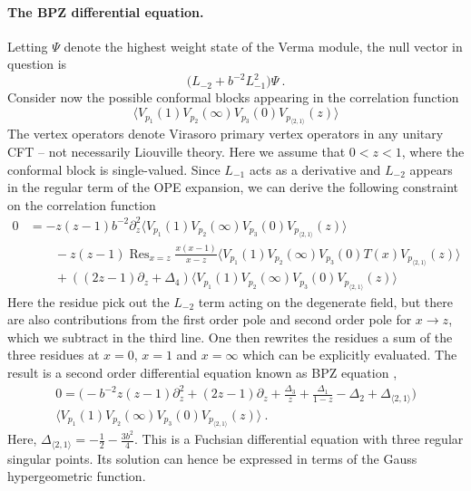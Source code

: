 \documentclass[12pt,a4paper]{article}
\newcommand{\be}{\begin{equation}}
\newcommand{\ee}{\end{equation}}
\DeclareMathOperator*{\Res}{Res}
\begin{document}
\paragraph{The BPZ differential equation.} Letting $\Psi$ denote the highest weight state of the Verma module, the null vector in question is 
\be  
\big(L_{-2}+b^{-2} L_{-1}^2\big)\Psi\ .
\ee
Consider now the possible conformal blocks appearing in the correlation function
\be  
\big\langle V_{p_1}(1) V_{p_2}(\infty) V_{p_3}(0) V_{p_{\langle 2,1 \rangle}}(z) \big\rangle
\ee
The vertex operators denote Virasoro primary vertex operators in any unitary CFT -- not necessarily Liouville theory. Here we assume that $0<z<1$, where the conformal block is single-valued. Since $L_{-1}$ acts as a derivative and $L_{-2}$ appears in the regular term of the OPE expansion, we can derive the following constraint on the correlation function
\begin{align}
    0&=-z(z-1)b^{-2} \partial_z^2 \big\langle V_{p_1}(1) V_{p_2}(\infty) V_{p_3}(0) V_{p_{\langle 2,1 \rangle}}(z) \big\rangle\nonumber\\
    &\qquad-z(z-1)\Res_{x=z} \frac{x(x-1)}{x-z}\big\langle V_{p_1}(1) V_{p_2}(\infty) V_{p_3}(0) T(x) V_{p_{\langle 2,1 \rangle}}(z) \big\rangle\nonumber\\
    &\qquad+\left((2z-1) \partial_z +\Delta_4\right)\big\langle V_{p_1}(1) V_{p_2}(\infty) V_{p_3}(0) V_{p_{\langle 2,1 \rangle}}(z) \big\rangle
\end{align}
Here the residue pick out the $L_{-2}$ term acting on the degenerate field, but there are also contributions from the first order pole and second order pole for $x \to z$, which we subtract in the third line. One then rewrites the residues a sum of the three residues at $x=0$, $x=1$ and $x=\infty$ which can be explicitly evaluated. The result is a second order differential equation known as BPZ equation \cite{Belavin:1984vu},
\begin{multline}
    0=\bigg(\!-b^{-2}z(z-1)\partial_z^2+(2z-1)\partial_z+\frac{\Delta_3}{z}+\frac{\Delta_1}{1-z} -\Delta_2+\Delta_{\langle 2,1 \rangle}\bigg)\\
    \big\langle V_{p_1}(1) V_{p_2}(\infty) V_{p_3}(0) V_{p_{\langle 2,1 \rangle}}(z) \big\rangle\ .  
\end{multline}
Here, $\Delta_{\langle 2,1 \rangle}=-\frac{1}{2}-\frac{3b^2}{4}$.
This is a Fuchsian differential equation with three regular singular points. Its solution can hence be expressed in terms of the Gauss hypergeometric function. 
\end{document}
